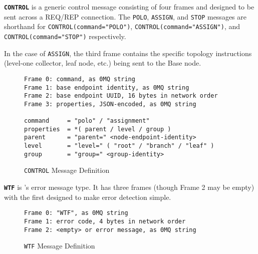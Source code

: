\textbf{\texttt{CONTROL}} is a generic control message consisting of four frames and designed to be sent across a
REQ/REP connection. The \texttt{POLO}, \texttt{ASSIGN}, and \texttt{STOP} messages are shorthand for
\texttt{CONTROL(command="POLO")}, \texttt{CONTROL(command="ASSIGN")}, and \texttt{CONTROL(command="STOP")} respectively.

In the case of \texttt{ASSIGN}, the third frame contains the specific topology instructions (level-one collector, leaf
node, etc.) being sent to the Base node.

\begin{figure}[H]
\vspace{+10pt}
\begin{verbatim}
Frame 0: command, as 0MQ string
Frame 1: base endpoint identity, as 0MQ string
Frame 2: base endpoint UUID, 16 bytes in network order
Frame 3: properties, JSON-encoded, as 0MQ string

command     = "polo" / "assignment"
properties  = *( parent / level / group )
parent      = "parent=" <node-endpoint-identity>
level       = "level=" ( "root" / "branch" / "leaf" )
group       = "group=" <group-identity>
\end{verbatim}
\vspace{-20pt}
\caption{\texttt{CONTROL} Message Definition}
\label{fig:message_control}
\end{figure}

\textbf{\texttt{WTF}} is \dcamp's error message type. It has three frames (though Frame 2 may be empty) with the first
designed to make error detection simple.

\begin{figure}[H]
\vspace{+10pt}
\begin{verbatim}
Frame 0: "WTF", as 0MQ string
Frame 1: error code, 4 bytes in network order
Frame 2: <empty> or error message, as 0MQ string
\end{verbatim}
\vspace{-20pt}
\caption{\texttt{WTF} Message Definition}
\label{fig:message_wtf}
\end{figure}
